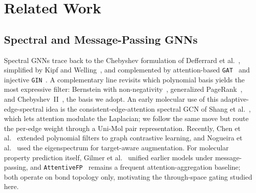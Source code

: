 \documentclass[conference]{IEEEtran}
\begin{document}
\section{Related Work}
\label{sec:related}

\subsection{Spectral and Message-Passing GNNs}
Spectral GNNs trace back to the Chebyshev formulation of Defferrard et al.~\cite{defferrard2016chebnet}, simplified by Kipf and Welling~\cite{kipf2017gcn}, and complemented by attention-based \texttt{GAT}~\cite{velickovic2018gat} and injective \texttt{GIN}~\cite{xu2019gin}. A complementary line revisits which polynomial basis yields the most expressive filter: Bernstein with non-negativity~\cite{he2021bernnet}, generalized PageRank~\cite{chien2021gprgnn}, and Chebyshev~II~\cite{he2022chebnetii}, the basis we adopt. An early molecular use of this adaptive-edge-spectral idea is the consistent-edge-attention spectral GCN of Shang et al.~\cite{shang2021eagcn}, which lets attention modulate the Laplacian; we follow the same move but route the per-edge weight through a Uni-Mol pair representation. Recently, Chen et al.~\cite{chen2024polygcl} extended polynomial filters to graph contrastive learning, and Nogueira et al.~\cite{nogueira2025spectra} used the eigenspectrum for target-aware augmentation. For molecular property prediction itself, Gilmer et al.~\cite{gilmer2017mpnn} unified earlier models under message-passing, and \texttt{AttentiveFP}~\cite{xiong2020attentivefp} remains a frequent attention-aggregation baseline; both operate on bond topology only, motivating the through-space gating studied here.
\end{document}
